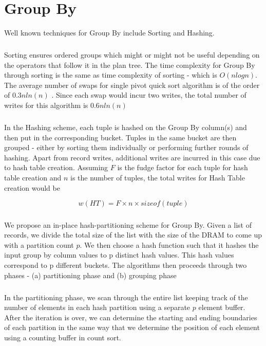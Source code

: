 \chapter{Group By}
\label{gby}

Well known techniques for Group By include Sorting and Hashing. 

\paragraph{}
Sorting ensures ordered groups which might or might not be useful depending on the operators that follow it in the plan tree. The time complexity for Group By through sorting is the same as time complexity of sorting - which is $O(nlogn)$. The average number of swaps for single pivot quick sort algorithm is of the order of $0.3nln(n)$ \cite{swaps}. Since each swap would incur two writes, the total number of writes for this algorithm is $0.6nln(n)$ 

\paragraph{}
In the Hashing scheme, each tuple is hashed on the Group By column(s) and then put in the corresponding bucket. Tuples in the same bucket are then grouped - either by sorting them individually or performing further rounds of hashing. Apart from record writes, additional writes are incurred in this case due to hash table creation. Assuming $F$ is the fudge factor for each tuple for hash table creation and $n$ is the number of tuples, the total writes for Hash Table creation would be 

$$w(HT) = F \times n \times sizeof(tuple)$$
\paragraph{}
We propose an in-place hash-partitioning scheme for Group By. Given a list of records, we divide the total size of the list with the size of the DRAM to come up with a partition count $p$. We then choose a hash function such that it hashes the input group by column values to p distinct hash values. This hash values correspond to p different buckets. The algorithms then proceeds through two phases - (a) partitioning phase and (b) grouping phase

\paragraph{}
In the partitioning phase, we scan through the entire list keeping track of the number of elements in each hash partition using a separate $p$ element buffer. After the iteration is over, we can determine the starting and ending boundaries of each partition in the same way that we determine the position of each element using a counting buffer in count sort. 

